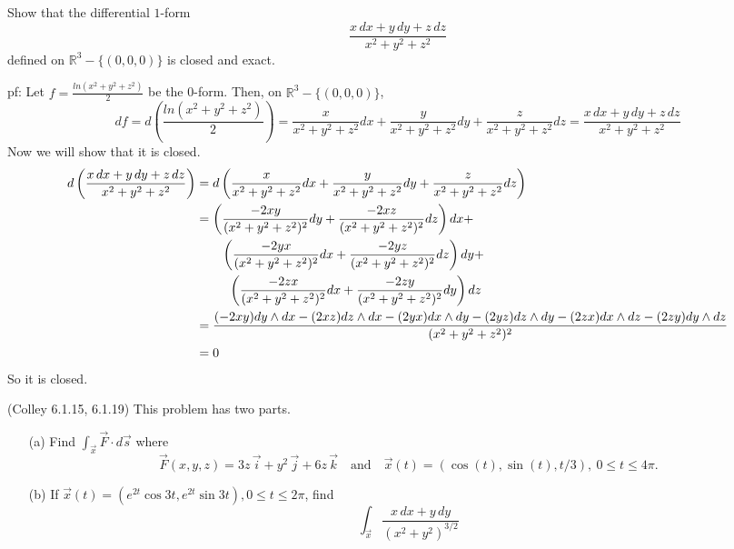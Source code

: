 \documentclass[11pt,letterpaper,cm]{nupset}
\begin{document}
\begin{problem}[Exercise 5] Show that the differential $1$-form
	$$\frac{x\,dx+y\,dy+z\,dz}{x^2+y^2+z^2}$$
	defined on $\mathbb{R}^3-\{(0,0,0)\}$ is closed and exact.
\end{problem}
\begin{solution}
	pf: Let $f=\frac{ln(x^2+y^2+z^2)}{2}$ be the 0-form. Then, on $\mathbb{R}^3-\{(0,0,0)\}$, 
	$$df=d\left(\frac{ln(x^2+y^2+z^2)}{2}\right)=\frac{x}{x^2+y^2+z^2}dx+\frac{y}{x^2+y^2+z^2}dy+\frac{z}{x^2+y^2+z^2}dz=\frac{x\,dx+y\,dy+z\,dz}{x^2+y^2+z^2}$$
	Now we will show that it is closed.
	\begin{align*}
		d\left(\frac{x\,dx+y\,dy+z\,dz}{x^2+y^2+z^2}\right)&=d\left(\frac{x}{x^2+y^2+z^2}dx+\frac{y}{x^2+y^2+z^2}dy+\frac{z}{x^2+y^2+z^2}dz\right)\\
		&=\left(\frac{-2xy}{(x^2+y^2+z^2)^2}dy+\frac{-2xz}{(x^2+y^2+z^2)^2}dz\right)dx+\\
		&\hspace*{7mm}\left(\frac{-2yx}{(x^2+y^2+z^2)^2}dx+\frac{-2yz}{(x^2+y^2+z^2)^2}dz\right)dy+\\
		&\hspace*{9mm}\left(\frac{-2zx}{(x^2+y^2+z^2)^2}dx+\frac{-2zy}{(x^2+y^2+z^2)^2}dy\right)dz\\
		&=\frac{(-2xy)dy\wedge dx-(2xz)dz\wedge dx-(2yx)dx\wedge dy-(2yz)dz\wedge dy-(2zx)dx\wedge dz-(2zy)dy\wedge dz}{(x^2+y^2+z^2)^2}\\
		&=0
	\end{align*}
	So it is closed. 
\end{solution}
\newpage

\begin{problem}[Exercise 6] (Colley 6.1.15, 6.1.19) This problem has two parts.
	
	\begin{itemize}
		\item[(a)] Find $\displaystyle\int_{\vec{x}} \vec{F} \cdot d\vec{s}$ where
		$$\vec{F}(x,y,z) = 3z\,\vec{i}+y^2\,\vec{j}+6z\,\vec{k} \quad\text{and}\quad \vec{x}(t) = (\cos(t), \sin(t), t/3),\ 0 \le t \le 4\pi.$$
		\item[(b)] If $\vec{x}(t) = (e^{2t}\cos 3t,e^{2t}\sin 3t), 0 \le t \le 2\pi$, find
		$$\int_{\vec{x}} \frac{x\,dx+y\,dy}{(x^2+y^2)^{3/2}}$$
	\end{itemize}
\end{problem}
\begin{solution}
\end{solution}
\newpage
 
\end{document}
